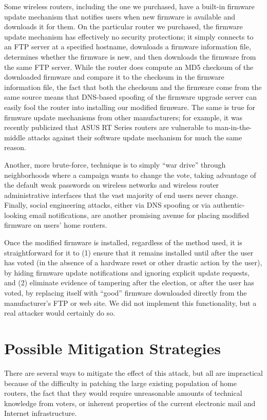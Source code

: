 \documentclass{article}
\begin{document}
Some wireless routers, including the one we purchased, have a built-in
firmware update mechanism that notifies users when new firmware is
available and downloads it for them. On the particular router we
purchased, the firmware update mechanism has effectively no security
protections; it simply connects to an FTP server at a specified
hostname, downloads a firmware information file, determines whether
the firmware is new, and then downloads the firmware from the same FTP
server. While the router does compute an MD5 checksum of the
downloaded firmware and compare it to the checksum in the firmware
information file, the fact that both the checksum and the firmware
come from the same source means that DNS-based spoofing of the
firmware upgrade server can easily fool the router into installing our
modified firmware. The same is true for firmware update mechanisms
from other manufacturers; for example, it was recently publicized that
ASUS RT Series routers are vulnerable to man-in-the-middle attacks
against their software update mechanism for much the same
reason.~\cite{AsusMITM}

Another, more brute-force, technique is to simply ``war drive''
through neighborhoods where a campaign wants to change the vote,
taking advantage of the default weak passwords on wireless networks
and wireless router administrative interfaces that the vast majority
of end users never change. Finally, social engineering attacks, either
via DNS spoofing or via authentic-looking email notifications, are
another promising avenue for placing modified firmware on users' home
routers.

Once the modified firmware is installed, regardless of the method
used, it is straightforward for it to (1) ensure that it remains
installed until after the user has voted (in the absence of a hardware
reset or other drastic action by the user), by hiding firmware update
notifications and ignoring explicit update requests, and (2) eliminate
evidence of tampering after the election, or after the user has voted,
by replacing itself with ``good'' firmware downloaded directly from
the manufacturer's FTP or web site. We did not implement this
functionality, but a real attacker would certainly do so.

\section{Possible Mitigation Strategies}

There are several ways to mitigate the effect of this attack, but all
are impractical because of the difficulty in patching the large
existing population of home routers, the fact that they would require
unreasonable amounts of technical knowledge from voters, or inherent
properties of the current electronic mail and Internet infrastructure.
\end{document}
